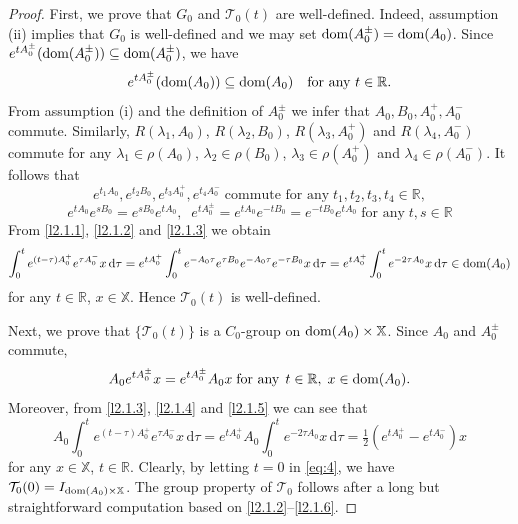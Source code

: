 \documentclass[11pt]{amsart}
\numberwithin{equation}{section}
\newcommand\R{\mathbb R}
\newcommand{\rmd}{{\mathrm{d}}}
\theoremstyle{remark}
\theoremstyle{definition}
\newcommand\cT{{\mathcal T}}
\newcommand\bX{{\mathbb X}}
\newcommand{\dom}{\text{\rm{dom}}}
\begin{document}
\begin{proof} First, we prove that $G_0$ and $\cT_0(t)$ are well-defined. Indeed, assumption (ii) implies that $G_0$ is well-defined and we may set $\dom(A_0^\pm)=\dom(A_0)$. Since $e^{tA_0^\pm}(\dom(A_0^\pm))\subseteq\dom(A_0^\pm)$, we have
\begin{equation}\label{l2.1.1}
		e^{tA_0^\pm}(\dom(A_0))\subseteq\dom(A_0)\quad\text{for any }t\in\R.
	\end{equation}
From assumption (i) and the definition of $A_0^\pm$ we infer that $A_0,B_0,A_0^+,A_0^-$ commute. Similarly, $ R(\lambda_1,A_0)$, $R(\lambda_2,B_0)$, $R(\lambda_3,A_0^+)$ and $R(\lambda_4,A_0^-)$ commute 
for any $\lambda_1\in\rho(A_0)$, $\lambda_2\in\rho(B_0)$, $\lambda_3\in\rho(A_0^+)$ and $\lambda_4\in\rho(A_0^-)$. It follows that 
	\begin{equation}\label{l2.1.2}
		e^{t_1A_0},e^{t_2B_0},e^{t_3A_0^+},e^{t_4A_0^-}\;\mbox{commute for any}\;t_1,t_2,t_3,t_4\in\R,
	\end{equation}	
	\begin{equation}\label{l2.1.3}
		e^{tA_0}e^{sB_0}=e^{sB_0}e^{tA_0},\;\;e^{tA_0^\pm}=e^{tA_0}e^{-tB_0}=e^{-tB_0}e^{tA_0}\;\mbox{for any}\; t,s\in\R
	\end{equation}	
	From \eqref{l2.1.1}, \eqref{l2.1.2} and \eqref{l2.1.3} we obtain 
	\begin{equation}\label{l2.1.4}
		\int_0^t e^{(t-\tau)A_0^+}e^{\tau A_0^-}x\,\rmd\tau
		= e^{tA_0^+}\int_0^t e^{-A_0\tau}e^{\tau B_0}e^{-A_0\tau}e^{-\tau B_0}x\,\rmd\tau=e^{tA_0^+}\int_0^t e^{-2\tau A_0}x\,\rmd\tau\in\dom(A_0)
	\end{equation}
	for any $t\in\R$, $x\in\bX$. Hence $\cT_0(t)$ is well-defined.
	
	Next, we prove that $\{\cT_0(t)\}$ is a $C_0$-group on $\dom(A_0)\times \bX$. Since $A_0$ and $A_0^\pm$ commute,
	\begin{equation}\label{l2.1.5}
		A_0 e^{tA_0^\pm}x = e^{tA_0^\pm}A_0 x\;\mbox{for any}\;\,t\in\R,\;x\in\dom(A_0).
	\end{equation}
	Moreover, from \eqref{l2.1.3}, \eqref{l2.1.4} and \eqref{l2.1.5} we can see that 
	\begin{equation}\label{l2.1.6}
		A_0\int_0^t e^{(t-\tau)A_0^+}e^{\tau A_0^-}x\,\rmd\tau
		= e^{tA_0^+}A_0\int_0^t e^{-2\tau A_0}x\,\rmd\tau
		= \tfrac{1}{2}(e^{tA_0^+}-e^{tA_0^-})x
	\end{equation}
	for any $x\in \bX$, $t\in\R$. Clearly, by letting $t=0$ in \eqref{eq:4}, we have $\cT_0(0) = I_{\dom(A_0)\times \bX}$. The group property of $\cT_0$ follows after a long but straightforward computation based on \eqref{l2.1.2}--\eqref{l2.1.6}. 
	

\end{proof}
\end{document}
